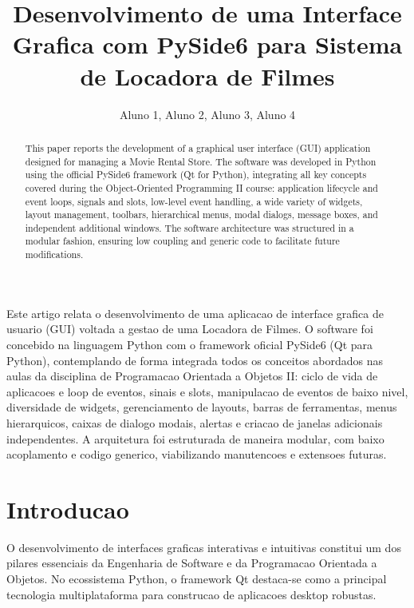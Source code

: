 ﻿\documentclass[12pt]{article}
\title{Desenvolvimento de uma Interface Grafica com PySide6 para Sistema de Locadora de Filmes}
\author{
  Aluno 1\inst{1}, Aluno 2\inst{1}, Aluno 3\inst{1}, Aluno 4\inst{1}
}
\begin{document}
\maketitle

\begin{abstract}
This paper reports the development of a graphical user interface (GUI) application designed for managing a Movie Rental Store. The software was developed in Python using the official PySide6 framework (Qt for Python), integrating all key concepts covered during the Object-Oriented Programming II course: application lifecycle and event loops, signals and slots, low-level event handling, a wide variety of widgets, layout management, toolbars, hierarchical menus, modal dialogs, message boxes, and independent additional windows. The software architecture was structured in a modular fashion, ensuring low coupling and generic code to facilitate future modifications.
\end{abstract}

\begin{resumo}
Este artigo relata o desenvolvimento de uma aplicacao de interface grafica de usuario (GUI) voltada a gestao de uma Locadora de Filmes. O software foi concebido na linguagem Python com o framework oficial PySide6 (Qt para Python), contemplando de forma integrada todos os conceitos abordados nas aulas da disciplina de Programacao Orientada a Objetos II: ciclo de vida de aplicacoes e loop de eventos, sinais e slots, manipulacao de eventos de baixo nivel, diversidade de widgets, gerenciamento de layouts, barras de ferramentas, menus hierarquicos, caixas de dialogo modais, alertas e criacao de janelas adicionais independentes. A arquitetura foi estruturada de maneira modular, com baixo acoplamento e codigo generico, viabilizando manutencoes e extensoes futuras.
\end{resumo}

\section{Introducao}

O desenvolvimento de interfaces graficas interativas e intuitivas constitui um dos pilares essenciais da Engenharia de Software e da Programacao Orientada a Objetos. No ecossistema Python, o framework Qt destaca-se como a principal tecnologia multiplataforma para construcao de aplicacoes desktop robustas.
\end{document}
